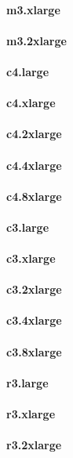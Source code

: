 \documentclass{acm_proc_article-sp}
\begin{document}
\paragraph{m3.xlarge}
\paragraph{m3.2xlarge}
\paragraph{c4.large}
\paragraph{c4.xlarge}
\paragraph{c4.2xlarge}
\paragraph{c4.4xlarge}
\paragraph{c4.8xlarge}
\paragraph{c3.large}
\paragraph{c3.xlarge}
\paragraph{c3.2xlarge}
\paragraph{c3.4xlarge}
\paragraph{c3.8xlarge}
\paragraph{r3.large}
\paragraph{r3.xlarge}
\paragraph{r3.2xlarge}
\end{document}
